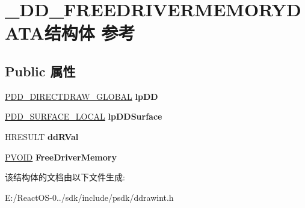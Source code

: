 \hypertarget{struct___d_d___f_r_e_e_d_r_i_v_e_r_m_e_m_o_r_y_d_a_t_a}{}\section{\+\_\+\+D\+D\+\_\+\+F\+R\+E\+E\+D\+R\+I\+V\+E\+R\+M\+E\+M\+O\+R\+Y\+D\+A\+T\+A结构体 参考}
\label{struct___d_d___f_r_e_e_d_r_i_v_e_r_m_e_m_o_r_y_d_a_t_a}
\subsection*{Public 属性}
\begin{DoxyCompactItemize}
\item 
\mbox{\label{struct___d_d___f_r_e_e_d_r_i_v_e_r_m_e_m_o_r_y_d_a_t_a_a690d4f340b486b155e11470081d79edb}} 
\hyperlink{struct___d_d___d_i_r_e_c_t_d_r_a_w___g_l_o_b_a_l}{P\+D\+D\+\_\+\+D\+I\+R\+E\+C\+T\+D\+R\+A\+W\+\_\+\+G\+L\+O\+B\+AL} {\bfseries lp\+DD}
\item 
\mbox{\label{struct___d_d___f_r_e_e_d_r_i_v_e_r_m_e_m_o_r_y_d_a_t_a_a484b713254ba1781e02c0d59ca9864fe}} 
\hyperlink{struct___d_d___s_u_r_f_a_c_e___l_o_c_a_l}{P\+D\+D\+\_\+\+S\+U\+R\+F\+A\+C\+E\+\_\+\+L\+O\+C\+AL} {\bfseries lp\+D\+D\+Surface}
\item 
\mbox{\label{struct___d_d___f_r_e_e_d_r_i_v_e_r_m_e_m_o_r_y_d_a_t_a_a1a1edfc3af5bc54d457b3d133c7854a8}} 
H\+R\+E\+S\+U\+LT {\bfseries dd\+R\+Val}
\item 
\mbox{\label{struct___d_d___f_r_e_e_d_r_i_v_e_r_m_e_m_o_r_y_d_a_t_a_aec83a7ef9b81ffad56abc34cb46c96a6}} 
\hyperlink{interfacevoid}{P\+V\+O\+ID} {\bfseries Free\+Driver\+Memory}
\end{DoxyCompactItemize}


该结构体的文档由以下文件生成\+:\begin{DoxyCompactItemize}
\item 
E\+:/\+React\+O\+S-\/0../sdk/include/psdk/ddrawint.\+h\end{DoxyCompactItemize}
